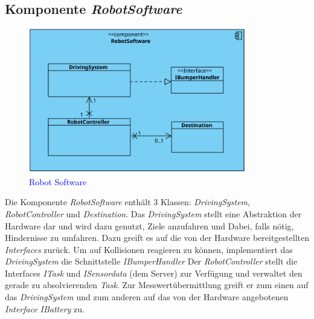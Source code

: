 \subsection{Komponente \textit{RobotSoftware}}
\begin{figure}[H]
\centering
\includegraphics[width=0.85\textwidth]{img/52.svg}
\caption{\textcolor{blue}{Robot Software}}
\label{KomponentenStruktur2}
\end{figure}
Die Komponente \textit{RobotSoftware} enthält 3 Klassen: \textit{DrivingSystem}, \textit{RobotController} und \textit{Destination}. 
Das \textit{DrivingSystem} stellt eine Abstraktion der Hardware dar und wird dazu genutzt, Ziele anzufahren und Dabei, 
falls nötig, Hindernisse zu umfahren. Dazu greift es auf die von der Hardware bereitgestellten \textit{Interfaces} zurück. 
Um auf Kollisionen reagieren zu können, implementiert das \textit{DrivingSystem} die Schnittstelle \textit{IBumperHandler}
Der \textit{RobotController} stellt die Interfaces \textit{ITask} und \textit{ISensordata} (dem Server) zur Verfügung und verwaltet den gerade 
zu absolvierenden \textit{Task}. Zur Messwertübermittlung greift er zum einen auf das \textit{DrivingSystem} und zum anderen auf das 
von der Hardware angebotenen \textit{Interface} \textit{IBattery} zu.

